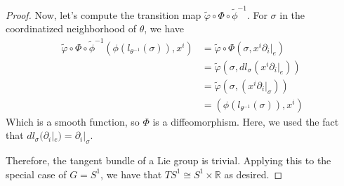 \documentclass[fontsize=11pt]{scrartcl} %
\numberwithin{equation}{section} %
\numberwithin{figure}{section} %
\numberwithin{table}{section} %
\newcommand{\R}{\mathbb{R}}
\begin{document}
\begin{proof}
Now, let's compute the transition map $\widetilde{\varphi}\circ\Phi\circ\widetilde{\phi}^{-1}$.
For $\sigma$ in the coordinatized neighborhood of $\theta$, we have
\[
\begin{aligned}
\widetilde{\varphi}\circ\Phi\circ\widetilde{\phi}^{-1}(\phi(l_{\theta^{-1}}(\sigma)),x^i) &= \widetilde{\varphi}\circ\Phi(\sigma,x^i\partial_i|_e)\\
                &=\widetilde{\varphi}(\sigma,dl_{\sigma}(x^i\partial_i|_e))\\
                &=\widetilde{\varphi}(\sigma,(x^i\partial_i|_{\sigma}))\\
                &=(\phi(l_{\theta^{-1}}(\sigma)),x^i)
\end{aligned}
\]
Which is a smooth function, so $\Phi$ is a diffeomorphism.
Here, we used the fact that $dl_{\sigma}(\partial_i|_e) = \partial_i|_{\sigma}$.

Therefore, the tangent bundle of a Lie group is trivial.
Applying this to the special case of $G=S^1$, we have that $TS^1\cong S^1\times\R$ as
desired.
\end{proof}
\pagebreak
\end{document}
